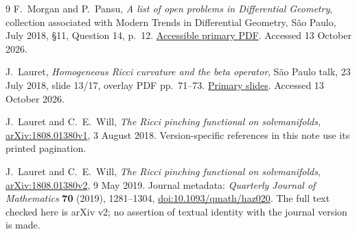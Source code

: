 \documentclass[11pt]{article}
\begin{document}
\begin{thebibliography}{9}
F.~Morgan and P.~Pansu,
\emph{A list of open problems in Differential Geometry},
collection associated with Modern Trends in Differential Geometry,
S\~ao Paulo, July 2018, \S11, Question 14, p.~12.
\href{https://www.imo.universite-paris-saclay.fr/~pierre.pansu/problems_MTDG.pdf}
{Accessible primary PDF}. Accessed 13 October 2026.

J.~Lauret,
\emph{Homogeneous Ricci curvature and the beta operator},
S\~ao Paulo talk, 23 July 2018, slide 13/17,
overlay PDF pp.~71--73.
\href{https://www.ime.usp.br/~mtg/slides/j_lauret.pdf}{Primary slides}.
Accessed 13 October 2026.

J.~Lauret and C.~E.~Will,
\emph{The Ricci pinching functional on solvmanifolds},
\href{https://arxiv.org/abs/1808.01380v1}{arXiv:1808.01380v1},
3 August 2018. Version-specific references in this note use its
printed pagination.

J.~Lauret and C.~E.~Will,
\emph{The Ricci pinching functional on solvmanifolds},
\href{https://arxiv.org/abs/1808.01380v2}{arXiv:1808.01380v2},
9 May 2019. Journal metadata: \emph{Quarterly Journal of Mathematics}
\textbf{70} (2019), 1281--1304,
\href{https://doi.org/10.1093/qmath/haz020}{doi:10.1093/qmath/haz020}.
The full text checked here is arXiv v2; no assertion of
textual identity with the journal version is made.
\end{thebibliography}
\end{document}

